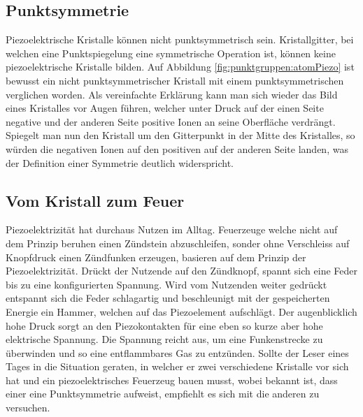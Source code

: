 \subsection{Punktsymmetrie}
Piezoelektrische Kristalle können nicht punktsymmetrisch sein.
Kristallgitter, bei welchen eine Punktspiegelung eine symmetrische Operation ist, können keine piezoelektrische Kristalle bilden.
Auf Abbildung \ref{fig:punktgruppen:atomPiezo} ist bewusst  ein nicht punktsymmetrischer Kristall 
mit einem punktsymmetrischen  verglichen worden.
Als vereinfachte Erklärung kann man sich wieder das Bild eines Kristalles vor Augen führen, 
welcher unter Druck auf der einen Seite negative und der anderen Seite positive Ionen an seine Oberfläche verdrängt.
Spiegelt man nun den Kristall um den Gitterpunkt in der Mitte des Kristalles, so würden die negativen Ionen auf den positiven auf der anderen Seite landen,
was der Definition einer Symmetrie deutlich widerspricht.

\subsection{Vom Kristall zum Feuer}
Piezoelektrizität hat durchaus Nutzen im Alltag.
Feuerzeuge welche nicht auf dem Prinzip beruhen einen Zündstein abzuschleifen, 
sonder ohne Verschleiss auf Knopfdruck einen Zündfunken erzeugen, basieren auf dem Prinzip der Piezoelektrizität.
Drückt der Nutzende auf den Zündknopf, spannt sich eine Feder bis zu eine konfigurierten Spannung.
Wird vom Nutzenden weiter gedrückt entspannt sich die Feder schlagartig und beschleunigt mit der gespeicherten Energie ein Hammer,
welchen auf das Piezoelement aufschlägt.
Der augenblicklich hohe Druck sorgt an den Piezokontakten für eine eben so kurze aber hohe elektrische Spannung.
Die Spannung reicht aus, um eine Funkenstrecke zu überwinden und so eine entflammbares Gas zu entzünden.
Sollte der Leser eines Tages in die Situation geraten, in welcher er zwei verschiedene Kristalle vor sich hat und ein piezoelektrisches Feuerzeug bauen musst, wobei bekannt ist, dass einer eine Punktsymmetrie aufweist, empfiehlt es sich mit die anderen zu versuchen.

